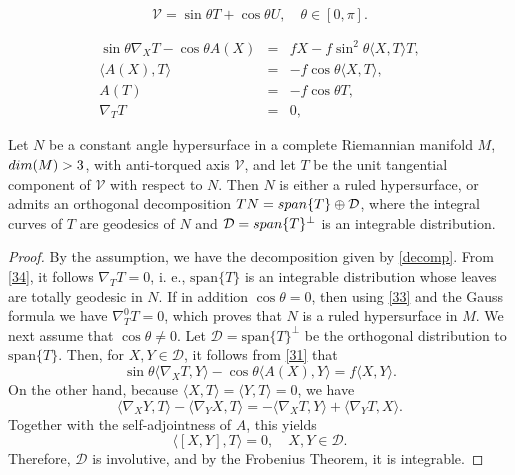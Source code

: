 \documentclass[10pt,a4paper]{amsart}
\def\v{\mathcal V}
\begin{document}
\begin{equation}\label{decomp}
\v=\sin \theta T +\cos \theta U, \quad \theta \in [0,\pi]. 
\end{equation}

\begin{eqnarray}
\sin \theta \nabla_X T -\cos \theta A(X)&=&fX-f\sin^2 \theta\langle X,T\rangle T, \label{31}\\ 
\langle A(X),T\rangle&=&-f\cos\theta\langle X,T\rangle,  \label{32}\\
A(T) &=&-f\cos\theta T, \label{33}\\
\nabla_T T&=&0, \label{34}
\end{eqnarray}

\begin{proposition} \label{phs1}
Let $N$ be a constant angle hypersurface in a complete Riemannian manifold $M$, $\textnormal{dim}(M)>3$, with anti-torqued axis $\v$, and let $T$ be the unit tangential component of $\v$ with respect to $N$. Then $N$ is either a ruled hypersurface, or admits an orthogonal decomposition $TN=\textnormal{span}\{T\}\oplus \mathcal{D}$, where the integral curves of $T$ are geodesics of $N$ and $ \mathcal{D} =\textnormal{span}\{T\}^\perp$ is an integrable distribution.
\end{proposition}

\begin{proof}
By the assumption, we have the decomposition given by \eqref{decomp}. From \eqref{34}, it follows $\nabla_TT=0$, i. e., $\mbox{span}\{T\}$ is an integrable distribution whose leaves are totally geodesic in $N$. If in addition $\cos\theta=0$, then using \eqref{33} and the Gauss formula we have $\nabla^0_TT=0$, which proves that $N$ is a ruled hypersurface in $M$. We next assume that $\cos\theta \neq 0$. Let $\mathcal{D}=\mbox{span}\{T\}^{\perp}$ be the orthogonal distribution to $\mbox{span}\{T\}$. Then, for $X,Y \in \mathcal{D}$, it follows from \eqref{31} that 
$$
 \sin \theta \langle \nabla_X T,Y \rangle -\cos \theta \langle A(X),Y\rangle =f\langle X,Y \rangle.
$$
On the other hand, because $\langle X  ,T\rangle=\langle Y  ,T\rangle=0$, we have
$$
\langle \nabla_X Y ,T\rangle-\langle \nabla_Y X ,T\rangle=-\langle \nabla_X T ,Y\rangle+\langle \nabla_Y T ,X\rangle.
$$
Together with the self-adjointness of $A$, this yields
$$
\langle [X, Y] ,T\rangle=0, \quad X,Y \in \mathcal{D}.
$$
Therefore, $\mathcal{D}$ is involutive, and by the Frobenius Theorem, it is integrable. 
\end{proof}
\end{document}
